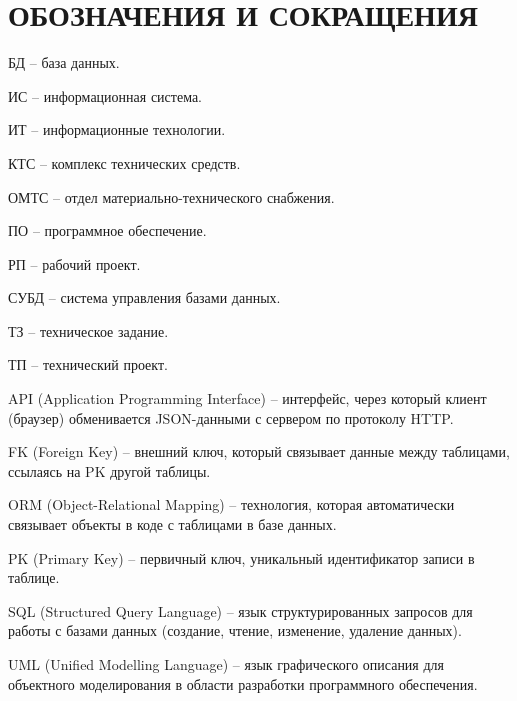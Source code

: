 \section*{ОБОЗНАЧЕНИЯ И СОКРАЩЕНИЯ}

БД -- база данных.

ИС -- информационная система.

ИТ -- информационные технологии. 

КТС -- комплекс технических средств.

ОМТС -- отдел материально-технического снабжения. 

ПО -- программное обеспечение.

РП -- рабочий проект.

СУБД -- система управления базами данных.

ТЗ -- техническое задание.

ТП -- технический проект.

API (Application Programming Interface) -- интерфейс, через который клиент (браузер) обменивается JSON-данными с сервером по протоколу HTTP.

FK (Foreign Key) -- внешний ключ, который связывает данные между таблицами, ссылаясь на PK другой таблицы.

ORM (Object-Relational Mapping) -- технология, которая автоматически связывает объекты в коде с таблицами в базе данных.

PK (Primary Key) -- первичный ключ, уникальный идентификатор записи в таблице.

SQL (Structured Query Language) -- язык структурированных запросов для работы с базами данных (создание, чтение, изменение, удаление данных).

UML (Unified Modelling Language) -- язык графического описания для объектного моделирования в области разработки программного обеспечения.